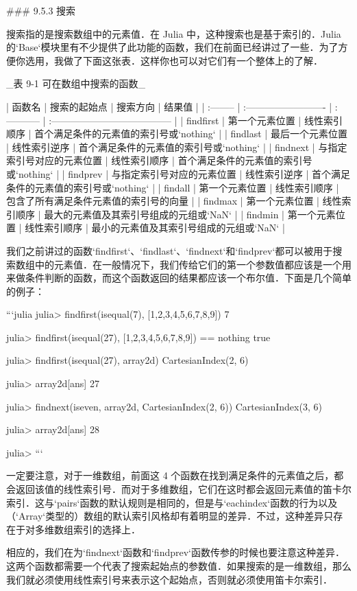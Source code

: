### 9.5.3 搜索

搜索指的是搜索数组中的元素值．在 Julia 中，这种搜索也是基于索引的．Julia 的`Base`模块里有不少提供了此功能的函数，我们在前面已经讲过了一些．为了方便你选用，我做了下面这张表．这样你也可以对它们有一个整体上的了解．

_表 9-1 可在数组中搜索的函数_

| 函数名    | 搜索的起始点               | 搜索方向     | 结果值                                  |
| :-------- | :------------------------- | :----------- | :-------------------------------------- |
| findfirst | 第一个元素位置             | 线性索引顺序 | 首个满足条件的元素值的索引号或`nothing` |
| findlast  | 最后一个元素位置           | 线性索引逆序 | 首个满足条件的元素值的索引号或`nothing` |
| findnext  | 与指定索引号对应的元素位置 | 线性索引顺序 | 首个满足条件的元素值的索引号或`nothing` |
| findprev  | 与指定索引号对应的元素位置 | 线性索引逆序 | 首个满足条件的元素值的索引号或`nothing` |
| findall   | 第一个元素位置             | 线性索引顺序 | 包含了所有满足条件元素值的索引号的向量  |
| findmax   | 第一个元素位置             | 线性索引顺序 | 最大的元素值及其索引号组成的元组或`NaN` |
| findmin   | 第一个元素位置             | 线性索引顺序 | 最小的元素值及其索引号组成的元组或`NaN` |

我们之前讲过的函数`findfirst`、`findlast`、`findnext`和`findprev`都可以被用于搜索数组中的元素值．在一般情况下，我们传给它们的第一个参数值都应该是一个用来做条件判断的函数，而这个函数返回的结果都应该一个布尔值．下面是几个简单的例子：

```julia
julia> findfirst(isequal(7), [1,2,3,4,5,6,7,8,9])
7

julia> findfirst(isequal(27), [1,2,3,4,5,6,7,8,9]) == nothing
true

julia> findfirst(isequal(27), array2d)
CartesianIndex(2, 6)

julia> array2d[ans]
27

julia> findnext(iseven, array2d, CartesianIndex(2, 6))
CartesianIndex(3, 6)

julia> array2d[ans]
28

julia> 
```

一定要注意，对于一维数组，前面这 4 个函数在找到满足条件的元素值之后，都会返回该值的线性索引号．而对于多维数组，它们在这时都会返回元素值的笛卡尔索引．这与`pairs`函数的默认规则是相同的，但是与`eachindex`函数的行为以及（`Array`类型的）数组的默认索引风格却有着明显的差异．不过，这种差异只存在于对多维数组索引的选择上．

相应的，我们在为`findnext`函数和`findprev`函数传参的时候也要注意这种差异．这两个函数都需要一个代表了搜索起始点的参数值．如果搜索的是一维数组，那么我们就必须使用线性索引号来表示这个起始点，否则就必须使用笛卡尔索引．

